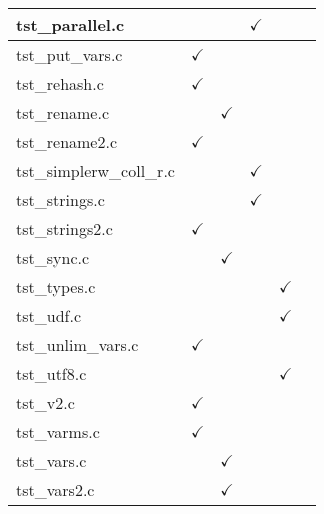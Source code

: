 \begin{table}[H]
\begin{tabular}{|l|c|c|c|c|c|}
tst\_parallel.c         &               &               & $\checkmark$  &               &               \\ \hline
tst\_put\_vars.c        & $\checkmark$  &               &               &               &               \\ \hline
tst\_rehash.c           & $\checkmark$  &               &               &               &               \\ \hline
tst\_rename.c           &               &  $\checkmark$ &               &               &               \\ \hline
tst\_rename2.c          & $\checkmark$  &               &               &               &               \\ \hline
tst\_simplerw\_coll\_r.c   &            &               & $\checkmark$  &               &               \\ \hline
tst\_strings.c          &               &               & $\checkmark$  &               &               \\ \hline
tst\_strings2.c         & $\checkmark$  &               &               &               &               \\ \hline
tst\_sync.c             &               & $\checkmark$  &               &               &               \\ \hline
tst\_types.c            &               &               &               & $\checkmark$  &               \\ \hline
tst\_udf.c              &               &               &               & $\checkmark$  &               \\ \hline
tst\_unlim\_vars.c      & $\checkmark$  &               &               &               &               \\ \hline
tst\_utf8.c             &               &               &               & $\checkmark$  &               \\ \hline
tst\_v2.c               & $\checkmark$  &               &               &               &               \\ \hline
tst\_varms.c            & $\checkmark$  &               &               &               &               \\ \hline
tst\_vars.c             &               & $\checkmark$  &               &               &               \\ \hline
tst\_vars2.c            &               & $\checkmark$  &               &               &               \\ \hline

\end{tabular}
\end{table}

